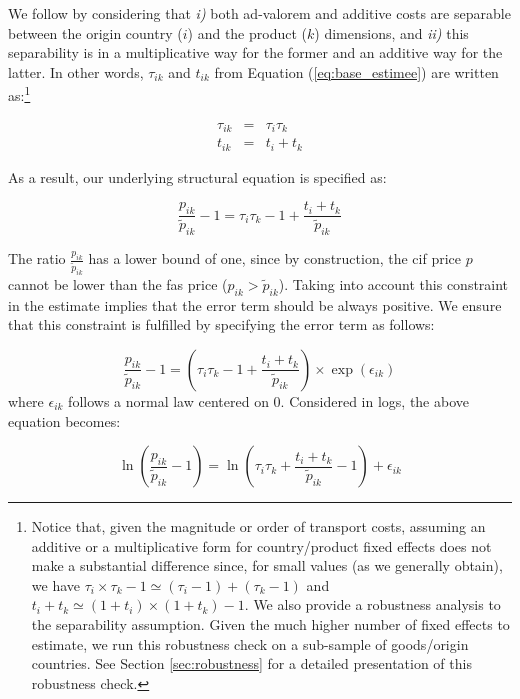 \documentclass[a4paper,11pt]{article}
\begin{document}
We follow \cite{Irrazabal_2015} by considering that \textit{i)} both ad-valorem and additive costs are separable between the origin country ($i$) and the product ($k$) dimensions, and \textit{ii)} this separability is in a multiplicative way for the former and an additive way for the latter.
In other words, $\tau_{ik}$ and $t_{ik}$ from Equation (\ref{eq:base_estimee}) are written as:\footnote{Notice that, given the magnitude or order of transport costs, assuming an additive or a multiplicative form for country/product fixed effects does not make a substantial difference since, for small values (as we generally obtain), we have $\tau_i\times \tau_k -1 \simeq (\tau_i -1)+ (\tau_k-1)$ and $t_i+t_k\simeq (1+t_i)\times(1+t_k)-1$.
We also provide a robustness analysis to the separability assumption. Given the much higher number of fixed effects to estimate, we run this robustness check on a sub-sample of goods/origin countries. See Section \ref{sec:robustness} for a detailed presentation of this robustness check.}

\begin{eqnarray}
\tau_{ik} &=&  \tau_{i} \tau_{k} \label{eq:ad-valorem}\\
t_{ik} &=& t_{i} + t_{k} \label{eq:add}
\end{eqnarray}

\noindent As a result, our underlying structural equation is specified as:

\begin{equation*}
\frac{p_{ik}}{\widetilde{p}_{ik}}-1 =\tau_{i}\tau_{k} -1 +\frac{t_{i} + t_{k}}{ \widetilde{p}_{ik}} \label{eq:theory_equation}
\end{equation*}

The ratio $\frac{p_{ik}}{\widetilde{p}_{ik}}$ has a lower bound of one, since by construction, the cif price $p$ cannot be lower than the fas price ($p_{ik}>\widetilde{p}_{ik}$).
Taking into account this constraint in the estimate implies that the error term should be always positive.
We ensure that this constraint is fulfilled by specifying the error term as follows:

\begin{equation*}
\frac{p_{ik}}{\widetilde{p}_{ik}}-1 =\left(\tau_{i}\tau_{k} -1+\frac{t_{i} + t_{k}}{\widetilde{p}_{ik}} \right)\times \exp(\epsilon_{ik})
\end{equation*}
\noindent where $\epsilon_{ik}$ follows a normal law centered on 0.
Considered in logs, the above equation becomes:

\begin{equation}
\ln\left(\frac{p_{ik}}{\widetilde{p}_{ik}}-1 \right)= \ln \left(\tau_{i}\tau_{k}+\frac{t_{i} + t_{k}}{\widetilde{p}_{ik}}-1 \right) + \epsilon_{ik} \label{eq:equation0}
\end{equation}
\end{document}

